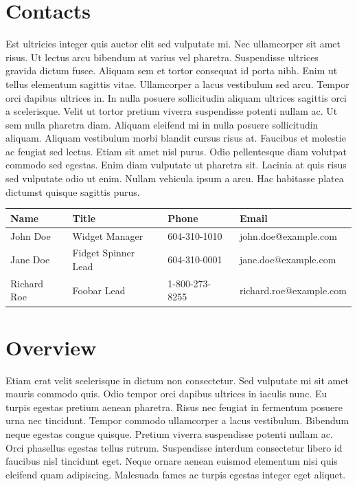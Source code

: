 \documentclass[10pt]{article}
\begin{document}
\section{Contacts}
Est ultricies integer quis auctor elit sed vulputate mi. Nec ullamcorper sit amet risus. Ut lectus arcu bibendum at varius vel pharetra. Suspendisse ultrices gravida dictum fusce. Aliquam sem et tortor consequat id porta nibh. Enim ut tellus elementum sagittis vitae. Ullamcorper a lacus vestibulum sed arcu. Tempor orci dapibus ultrices in. In nulla posuere sollicitudin aliquam ultrices sagittis orci a scelerisque. Velit ut tortor pretium viverra suspendisse potenti nullam ac. Ut sem
nulla pharetra diam. Aliquam eleifend mi in nulla posuere sollicitudin aliquam. Aliquam vestibulum morbi blandit cursus risus at. Faucibus et molestie ac feugiat sed lectus. Etiam sit amet nisl purus. Odio pellentesque diam volutpat commodo sed egestas. Enim diam vulputate ut pharetra sit. Lacinia at quis risus sed vulputate odio ut enim. Nullam vehicula ipsum a arcu. Hac habitasse platea dictumst quisque sagittis purus.

\begin{table}[!h]
\centering
\begin{tabular}{llll}
\toprule
Name            & Title               & Phone          & Email \\
\midrule
John Doe        & Widget Manager      & 604-310-1010   & john.doe@example.com \\
Jane Doe        & Fidget Spinner Lead & 604-310-0001   & jane.doe@example.com \\
Richard Roe     & Foobar Lead         & 1-800-273-8255 & richard.roe@example.com \\
\bottomrule
\end{tabular}
\end{table}

\section{Overview}
Etiam erat velit scelerisque in dictum non consectetur. Sed vulputate mi sit amet mauris commodo quis. Odio tempor orci dapibus ultrices in iaculis nunc. Eu turpis egestas pretium aenean pharetra. Risus nec feugiat in fermentum posuere urna nec tincidunt. Tempor commodo ullamcorper a lacus vestibulum. Bibendum neque egestas congue quisque. Pretium viverra suspendisse potenti nullam ac. Orci phasellus egestas tellus rutrum. Suspendisse interdum consectetur libero id faucibus nisl
tincidunt eget. Neque ornare aenean euismod elementum nisi quis eleifend quam adipiscing. Malesuada fames ac turpis egestas integer eget aliquet.
\end{document}

